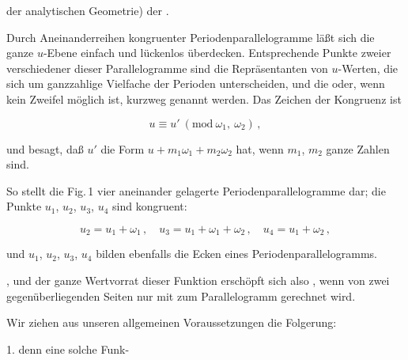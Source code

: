 
der analytischen Geometrie) der .

Durch Aneinanderreihen kongruenter Periodenparallelogramme
läßt sich die ganze $u$-Ebene einfach und lückenlos überdecken.
Entsprechende Punkte zweier verschiedener dieser Parallelogramme
sind die Repräsentanten von $u$-Werten, die sich um ganzzahlige
Vielfache der Perioden unterscheiden, und die  oder, wenn kein Zweifel möglich ist, kurzweg
 genannt werden. Das Zeichen der Kongruenz ist

\[ u \equiv u' \ (\mathrm{mod}\ \omega_1,\ \omega_2)\,, \]

und besagt, daß $u'$ die Form $u+m_1\omega_1+m_2\omega_2$ hat, wenn $m_1$, $m_2$
ganze Zahlen sind.


So stellt die Fig.\,1 vier aneinander gelagerte Periodenparallelogramme
 dar; die Punkte $u_1$, $u_2$, $u_3$, $u_4$ sind kongruent:

\[ u_2 = u_1+\omega_1\,,\quad u_3 = u_1+\omega_1+\omega_2\,,\quad u_4 = u_1+\omega_2\,, \]

und $u_1$, $u_2$, $u_3$, $u_4$ bilden ebenfalls die Ecken eines Periodenparallelogramms.

, und der ganze Wertvorrat
 dieser Funktion erschöpft sich also , wenn von zwei gegenüberliegenden Seiten nur
 mit zum Parallelogramm gerechnet wird.

Wir ziehen aus unseren allgemeinen Voraussetzungen die
Folgerung:

1.  denn eine solche Funk-
